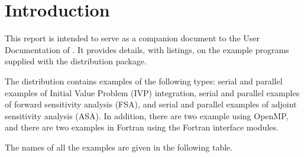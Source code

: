 \section{Introduction}\label{s:ex_intro}

This report is intended to serve as a companion document to the User
Documentation of {\idas} \cite{idas_ug}.  It provides details, with
listings, on the example programs supplied with the {\idas} distribution
package.

The {\idas} distribution contains examples of the following types: 
serial and parallel examples of Initial Value Problem (IVP) integration, 
serial and parallel examples of forward sensitivity analysis (FSA), and 
serial and parallel examples of adjoint sensitivity analysis (ASA).
In addition, there are two example using OpenMP, and there are two examples
in Fortran using the {\sundials} Fortran interface modules.

The names of all the examples are given in the following table.

